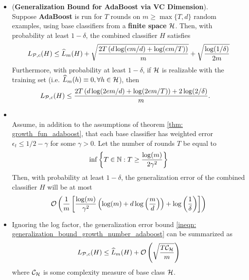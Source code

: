 \documentclass[11pt]{article}
\begin{document}
\begin{itemize}
\item \begin{theorem} \label{thm: growth_fun_adaboost}  (\textbf{Generalization Bound for AdaBoost via VC Dimension}). \citep{schapire2012boosting}\\
Suppose \textbf{AdaBoost} is run for $T$ rounds on $m \ge \max\{T, d\}$ random examples, using base classifiers from a \textbf{finite space} ${\mathcal H}$. Then, with probability at least $1 - \delta$, the combined classifier $H$ satisfies
\begin{align}
L_{{\mathcal P}, c}(H) \le \widehat{L}_{m}(H) + \sqrt{\frac{2 T\left( d\log(em/d) + \log(em/T) \right)}{m}} +\sqrt{\frac{\log(1/\delta)}{2m}} \label{ineqn: generalization_bound_growth_number_adaboost}
\end{align} Furthermore, with probability at least $1 - \delta$, if ${\mathcal H}$ is realizable with the training set (i.e. $\widehat{L}_{m}(h) \equiv 0, \forall h\in {\mathcal H}$), then
\begin{align}
L_{{\mathcal P}, c}(H) &\le \frac{2 T\left( d\log(2em/d) + \log(2em/T) \right) + 2\log(2/\delta)}{m}. \label{ineqn: pac_sample_complexity_consistency}
\end{align}
\end{theorem}



\item \begin{corollary}  \citep{schapire2012boosting}\\
Assume, in addition to the assumptions of theorem \ref{thm: growth_fun_adaboost}, that each base classifier has weighted error $\epsilon_t \le 1/2 - \gamma$ for some $\gamma > 0$. Let the number of rounds $T$ be equal to
\begin{align*}
\inf\left\{T \in {\mathbb N}: T \ge \frac{\log(m)}{2\gamma^2}\right\}
\end{align*} Then, with probability at least $1 - \delta$, the generalization error of the combined classifier $H$ will be at most
\begin{align*}
{\mathcal O}\left(\frac{1}{m}\left[\frac{\log(m)}{\gamma^2}\left(\log(m) + d\log\left(\frac{m}{d}\right)\right) + \log\left(\frac{1}{\delta}\right)\right]\right)
\end{align*}
\end{corollary}

\item \begin{remark}
Ignoring the log factor, the generalization error bound \eqref{ineqn: generalization_bound_growth_number_adaboost} can be summarized as
\begin{align*}
L_{{\mathcal P}, c}(H) \le \widehat{L}_{m}(H) + {\mathcal O}\left(\sqrt{\frac{T {\mathcal C}_{{\mathcal H}}}{m}}\right)
\end{align*} where ${\mathcal C}_{{\mathcal H}}$ is some complexity measure of base class ${\mathcal H}$.
\end{remark}


\end{itemize}
\end{document}
